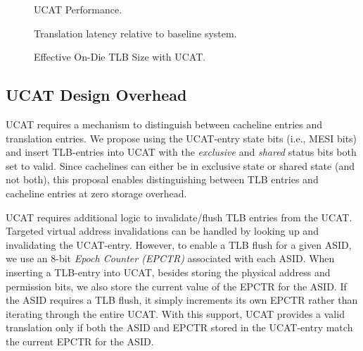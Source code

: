 \begin{figure}[tp] 
  \vspace{-0.in} \centering
  \centerline{}

  \caption{\small UCAT Performance. \normalsize}
  \label{fig:perf_UCAT} 
  \vspace{0.1 in}
\end{figure}

\begin{figure}[tp] 
  \vspace{0.in} \centering
  \centerline{}

  \caption{\small Translation latency relative to baseline system.\normalsize}
  \label{fig:tlblat_UCAT} 
  \vspace{-0.0 in}
\end{figure}

\begin{figure}[tp] 
  \vspace{0.in} \centering
  \centerline{}

  \caption{\small Effective On-Die TLB Size with UCAT.\normalsize}
  \label{fig:tlbsize_UCAT} 
  \vspace{-0.0 in}
\end{figure}


\subsection{UCAT Design Overhead}

\noindent UCAT requires a mechanism to distinguish between cacheline
entries and translation entries. We propose using the UCAT-entry state
bits (i.e., MESI bits) and insert TLB-entries into UCAT with the {\em
exclusive} and {\em shared} status bits both set to valid. Since
cachelines can either be in exclusive state or shared state (and not
both), this proposal enables distinguishing between TLB entries and
cacheline entries at zero storage overhead.

UCAT requires additional logic to invalidate/flush TLB entries from
the UCAT. Targeted virtual address invalidations can be handled by
looking up and invalidating the UCAT-entry. However, to enable a TLB
flush for a given ASID, we use an 8-bit {\em Epoch Counter (EPCTR)}
associated with each ASID. When inserting a TLB-entry into UCAT,
besides storing the physical address and permission bits, we also
store the current value of the EPCTR for the ASID. If the ASID
requires a TLB flush, it simply increments its own EPCTR rather than
iterating through the entire UCAT. With this support, UCAT provides a
valid translation only if both the ASID and EPCTR stored in the
UCAT-entry match the current EPCTR for the ASID.
